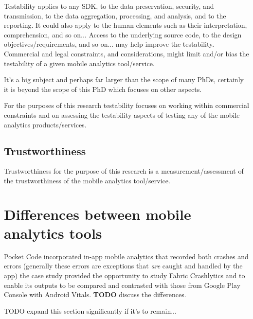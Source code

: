 Testability applies to any SDK, to the data preservation, security, and transmission, to the data aggregation, processing, and analysis, and to the reporting. It could also apply to the human elements such as their interpretation, comprehension, and so on... Access to the underlying source code, to the design objectives/requirements, and so on... may help improve the testability. Commercial and legal constraints, and considerations, might limit and/or bias the testability of a given mobile analytics tool/service.

It's a big subject and perhaps far larger than the scope of many PhDs, certainly it is beyond the scope of this PhD which focuses on other aspects. 

For the purposes of this research testability focuses on working within commercial constraints and on assessing the testability aspects of testing any of the mobile analytics products/services.


\subsection{Trustworthiness}
Trustworthiness for the purpose of this research is a measurement/assessment of the trustworthiness of the mobile analytics tool/service.


\section{Differences between mobile analytics tools}
Pocket Code incorporated in-app mobile analytics that recorded both crashes and errors (generally these errors are exceptions that \textit{are} caught and handled by the app) the case study provided the opportunity to study Fabric Crashlytics and to enable its outputs to be compared and contrasted with those from Google Play Console with Android Vitals. \textbf{TODO} discuss the differences.

TODO expand this section significantly if it's to remain...

